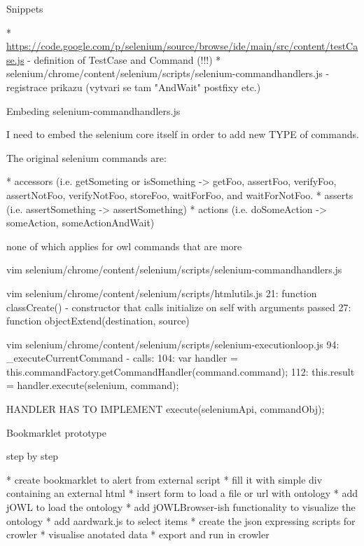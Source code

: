\sec Snippets

\begitems
  * \url{https://code.google.com/p/selenium/source/browse/ide/main/src/content/testCase.js} - definition of TestCase and Command (!!!)
  * selenium/chrome/content/selenium/scripts/selenium-commandhandlers.js - registrace prikazu (vytvari se tam "AndWait" postfixy etc.)
\enditems


\secc Embeding selenium-commandhandlers.js

I need to embed the selenium core itself in order to add new TYPE of commands. 

The original selenium commands are: 

\begitems
  * accessors (i.e. getSometing or isSomething -> getFoo, assertFoo, verifyFoo, assertNotFoo, verifyNotFoo, storeFoo, waitForFoo, and waitForNotFoo.
  * asserts (i.e. assertSomething -> assertSomething)
  * actions (i.e. doSomeAction -> someAction, someActionAndWait)
\enditems

none of which applies for owl commands that are more

\begtt
vim selenium/chrome/content/selenium/scripts/selenium-commandhandlers.js
\endtt

\begtt
vim selenium/chrome/content/selenium/scripts/htmlutils.js
21: function classCreate()
  - constructor that calls initialize on self with arguments passed
27: function objectExtend(destination, source)
\endtt

\begtt
vim selenium/chrome/content/selenium/scripts/selenium-executionloop.js
 94: _executeCurrentCommand - calls:
104: var handler = this.commandFactory.getCommandHandler(command.command);
112: this.result = handler.execute(selenium, command);
\endtt

HANDLER HAS TO IMPLEMENT execute(seleniumApi, commandObj);



\chap Bookmarklet prototype


\sec step by step

\begitems
  * create bookmarklet to alert from external script
  * fill it with simple \<div\> containing an external html
  * insert form to load a file or url with ontology
  * add jOWL to load the ontology
  * add jOWLBrowser-ish functionality to visualize the ontology
  * add aardwark.js to select items
  * create the json expressing scripts for crowler
  * visualise anotated data
  * export and run in crowler
\enditems


\bye
